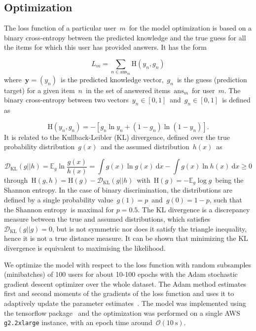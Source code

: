 \subsection{Optimization}
The loss function of a particular user~$m$~for the model optimization is based on a binary cross-entropy between the predicted knowledge and the true guess for all the items for which this user has provided answers. It has the form

\begin{equation}
L_m = \sum_{n \in \mathrm{ans}_m} \mathrm{H}(y_n, g_n)
\end{equation}
where~$\mathbf{y} = (y_n)$~is the predicted knowledge vector,~$g_n$~is the guess (prediction target) for a given item~$n$~in the set of answered items~$\mathrm{ans}_m$~for user~$m$. The binary cross-entropy between two vectors~$y_n\in[0,1]$~and~$g_n\in [0,1]$~is defined as

$$\mathrm{H}(y_n, g_n) = -[g_n \ln{y_n} + (1 - g_n)\ln{(1 - y_n)}].$$
It is related to the Kullback-Leibler (KL) divergence, defined over the true probability distribution~$g(x)$~and the assumed distribution~$h(x)$~as

\begin{equation}
\mathcal{D}_{\mathrm{KL}}(g||h) = \mathbb{E}_g \ln{\frac{g(x)}{h(x)}} = \int g(x) \ln{g(x)}\ \mathrm{d}x - \int g(x) \ln{h(x)}\ \mathrm{d}x \geq 0
\end{equation}
through~$\mathrm{H}(g,h) = \mathrm{H}(g) - \mathcal{D}_{\mathrm{KL}}(g||h)$~with~$\mathrm{H}(g) = -\mathbb{E}_g \log{g}$~being the Shannon entropy. In the case of binary discrimination, the distributions are defined by a single probability value~$g(1) = p$~and~$g(0) = 1 - p$, such that the Shannon entropy is maximal for $p=0.5$. The KL divergence is a discrepancy measure between the true and assumed distributions, which satisfies $\mathcal{D}_{\mathrm{KL}}(g||g) = 0$, but is not symmetric nor does it satisfy the triangle inequality, hence it is not a true distance measure. It can be shown that minimizing the KL divergence is equivalent to maximising the likelihood.

We optimize the model with respect to the loss function with random subsamples (minibatches) of 100 users for about 10-100 epochs with the Adam stochastic gradient descent optimizer over the whole dataset. The Adam method estimates first and second moments of the gradients of the loss function and uses it to adaptively update the parameter estimates~\cite{DBLP:journals/corr/KingmaB14}. The model was implemented using the tensorflow package~\cite{2016arXiv160304467A} and the optimization was performed on a single AWS \texttt{g2.2xlarge} instance, with an epoch time around~$\mathcal{O}(10~\mathrm{s})$.

